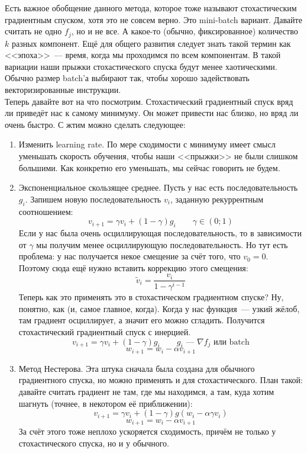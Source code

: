 \documentclass{article}
\begin{document}
    Есть важное обобщение данного метода, которое тоже называют стохастическим градиентным спуском, хотя это не совсем верно. Это mini-batch вариант. Давайте считать не одно $f_j$, но и не все. А какое-то (обычно, фиксированное) количество $k$ разных компонент. Ещё для общего развития следует знать такой термин как <<эпоха>>~--- время, когда мы проходимся по всем компонентам. В такой вариации наши прыжки стохастического спуска будут менее хаотическими. Обычно размер batch'а выбирают так, чтобы хорошо задействовать векторизированные инструкции.\\
    Теперь давайте вот на что посмотрим. Стохастический градиентный спуск вряд ли приведёт нас к самому минимуму. Он может привести нас близко, но вряд ли очень быстро. С жтим можно сделать следующее:
    \begin{enumerate}
        \item Изменить learning rate. По мере сходимости с минимуму имеет смысл уменьшать скорость обучения, чтобы наши <<прыжки>> не были слишком большими. Как конкретно его уменьшать, мы сейчас говорить не будем.
        \item Экспоненциальное скользящее среднее. Пусть у нас есть последовательность $g_i$. Запишем новую последовательность $v_i$, заданную рекуррентным соотношением:
        $$
        v_{i+1}=\gamma v_i+(1-\gamma)g_i\qquad\gamma\in(0;1)
        $$
        Если у нас была очень осциллирующая последовательность, то в зависимости от $\gamma$ мы получим менее осциллирующую последовательность. Но тут есть проблема: у нас получается некое смещение за счёт того, что $v_0=0$.\\
        Поэтому сюда ещё нужно вставить коррекцию этого смещения:
        $$
        \widetilde v_i=\frac{v_i}{1-\gamma^{i-1}}
        $$
        Теперь как это применять это в стохастическом градиентном спуске? Ну, понятно, как (и, самое главное, когда). Когда у нас функция~--- узкий жёлоб, там градиент осциллирует, а значит его можно сгладить. Получится стохастический градиентный спуск с инерцией.
        $$
        v_{i+1}=\gamma v_i+(1-\gamma)g_i\qquad g_i\text{~--- }\nabla f_j\text{ или batch}
        $$
        $$
        w_{i+1}=w_i-\alpha v_{i+1}
        $$
        \item Метод Нестерова. Эта штука сначала была создана для обычного градиентного спуска, но можно применять и для стохастического. План такой: давайте считать градиент не там, где мы находимся, а там, куда хотим шагнуть (точнее, в некотором её приближении):
        $$
        v_{i+1}=\gamma v_i+(1-\gamma)g(w_i-\alpha\gamma v_i)
        $$
        $$
        w_{i+1}=w_i-\alpha v_{i+1}
        $$
        За счёт этого тоже неплохо ускоряется сходимость, причём не только у стохастического спуска, но и у обычного.
    \end{enumerate}
\end{document}
